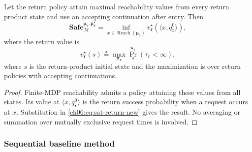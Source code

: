 \begin{revision}
\begin{theorem}
\label{ch06:theorem:safe-bound}
Let the return policy attain maximal reachability values from every return
product state and use an accepting continuation after entry. Then
\begin{equation}
\label{ch06:eq:theo-safe-bound}
\textbf{Safe}_{\mathcal M}^{\boldsymbol\mu_{\texttt o},
\boldsymbol\mu_{\texttt r}^{\star}}
=\inf_{x\in\operatorname{Reach}(\boldsymbol\mu_{\texttt o})}
v_{\texttt r}^{\star}(\langle x,q_{\texttt r}^0\rangle),
\end{equation}
where the return value is
\begin{equation}
\label{ch06:eq:vrstar}
v_{\texttt r}^{\star}(s)\triangleq
\max_{\boldsymbol\pi_{\texttt r}}
\Pr_s^{\boldsymbol\pi_{\texttt r}}(\tau_{\texttt r}<\infty),
\end{equation}
where $s$ is the return-product initial state and the maximization is over
return policies with accepting continuations.
\end{theorem}
\begin{proof}
Finite-MDP reachability admits a policy attaining these values from all
states. Its value at $\langle x,q_{\texttt r}^0\rangle$ is the return
success probability when a request occurs at $x$. Substitution in
\eqref{ch06:eq:sat-return-new} gives the result. No averaging or summation
over mutually exclusive request times is involved.
\end{proof}
\end{revision}

\subsubsection{Sequential baseline method}
\label{ch06:subsec:complexity}


